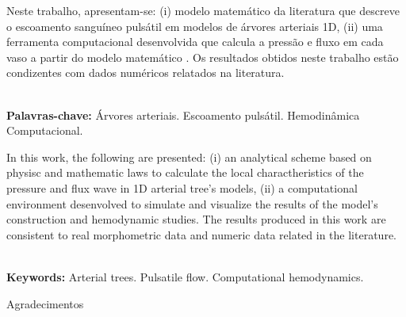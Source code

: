 \documentclass[a4paper,12pt]{monografia}
\theoremstyle{plain}
\theoremstyle{definition}
\theoremstyle{remark}
\begin{document}










Neste trabalho, apresentam-se: (i) modelo matemático da literatura que descreve o escoamento sanguíneo pulsátil em modelos de árvores arteriais 1D, (ii) uma ferramenta computacional desenvolvida que calcula a pressão e fluxo em cada vaso a partir do modelo matemático . Os resultados obtidos neste trabalho estão condizentes com dados numéricos relatados na literatura.

\noindent \\ \textbf{Palavras-chave:} Árvores arteriais. Escoamento pulsátil. Hemodinâmica Computacional.




In this work, the following are presented: (i) an analytical scheme based on physisc and mathematic laws to calculate the local charactheristics of the pressure and flux wave in 1D arterial tree's models, (ii) a computational environment desenvolved to simulate and visualize the results of the model's construction and hemodynamic studies. The results produced in this work are consistent to real morphometric data and numeric data related in the literature.

\noindent \\ \textbf{Keywords:} Arterial trees. Pulsatile flow. Computational hemodynamics. %





 \indent\indent 
Agradecimentos
\newpage
\end{document}
